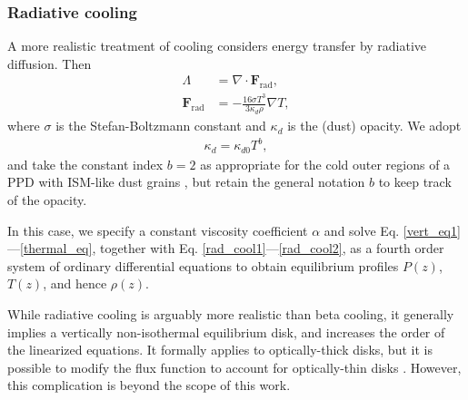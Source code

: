\subsubsection{Radiative cooling}\label{rad_cool}
A more realistic treatment of cooling considers energy transfer by radiative diffusion. Then
\begin{align}
  \Lambda &= \nabla\cdot\bm{F}_\mathrm{rad},\label{rad_cool1}\\
  \bm{F}_\mathrm{rad}   &= -\frac{16\sigma T^3}{3\kappa_d\rho}\nabla T, \label{rad_cool2}
\end{align}
where $\sigma$ is the Stefan-Boltzmann constant and 
$\kappa_d$ is the (dust) opacity. We adopt
\begin{align}\label{opacity_law}
  \kappa_d = \kappa_{d0}T^b,
\end{align}
and take the constant index $b=2$ as appropriate for the cold outer regions
of a PPD with ISM-like dust grains \citep{bell94}, but retain the general notation $b$
to keep track of the opacity.    

In this case, we specify a constant viscosity coefficient $\alpha$ and
solve Eq. \ref{vert_eq1}---\ref{thermal_eq}, together with
Eq. \ref{rad_cool1}---\ref{rad_cool2}, as a fourth order system of
ordinary differential equations to obtain equilibrium profiles $P(z)$, $T(z)$, and hence
$\rho(z)$.  

While radiative cooling is arguably more realistic than
beta cooling, it generally implies a vertically
non-isothermal equilibrium disk, and increases the order of the
linearized equations. It formally applies to optically-thick 
disks, but it is possible to modify the flux function to account
for optically-thin disks \citep{levermore81}. However, this
complication is beyond the scope of this work. 


